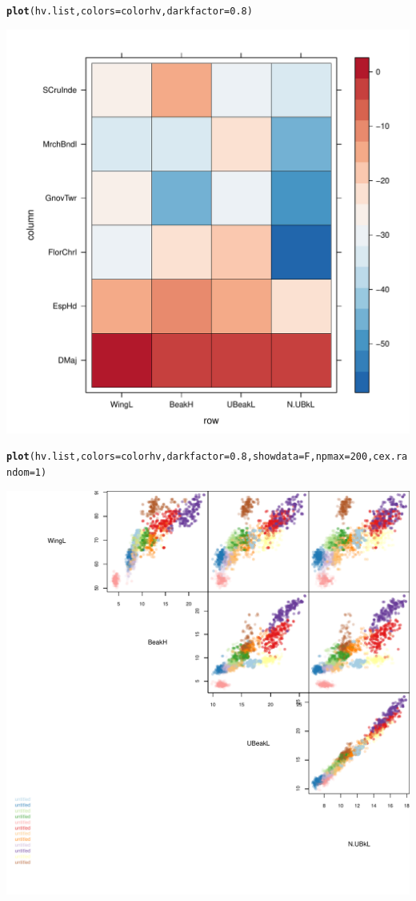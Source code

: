 \documentclass[12pt]{article}\usepackage[]{graphicx}\usepackage[]{color}
\makeatletter
\def\maxwidth{ %
  \ifdim\Gin@nat@width>\linewidth
    \linewidth
  \else
    \Gin@nat@width
  \fi
}
\newcommand{\hlnum}[1]{\textcolor[rgb]{0.686,0.059,0.569}{#1}}%
\newcommand{\hlstd}[1]{\textcolor[rgb]{0.345,0.345,0.345}{#1}}%
\newcommand{\hlkwc}[1]{\textcolor[rgb]{0.333,0.667,0.333}{#1}}%
\newcommand{\hlkwd}[1]{\textcolor[rgb]{0.737,0.353,0.396}{\textbf{#1}}}%
\newenvironment{kframe}{%
 \def\at@end@of@kframe{}%
 \ifinner\ifhmode%
  \def\at@end@of@kframe{\end{minipage}}%
  \begin{minipage}{\columnwidth}%
 \fi\fi%
 \def\FrameCommand##1{\hskip\@totalleftmargin \hskip-\fboxsep
 \colorbox{shadecolor}{##1}\hskip-\fboxsep
     \hskip-\linewidth \hskip-\@totalleftmargin \hskip\columnwidth}%
 \MakeFramed {\advance\hsize-\width
   \@totalleftmargin\z@ \linewidth\hsize
   \@setminipage}}%
 {\par\unskip\endMakeFramed%
 \at@end@of@kframe}
\newenvironment{knitrout}{}{} %
\makeatother
\begin{document}
\begin{knitrout}
\begin{kframe}
\begin{alltt}
\hlkwd{plot}\hlstd{(hv.list,} \hlkwc{colors} \hlstd{= colorhv,} \hlkwc{darkfactor} \hlstd{=} \hlnum{0.8}\hlstd{)}
\end{alltt}
\end{kframe}
\includegraphics[width=\maxwidth]{figure/unnamed-chunk-551} 
\begin{kframe}\begin{alltt}
\hlkwd{plot}\hlstd{(hv.list,} \hlkwc{colors} \hlstd{= colorhv,} \hlkwc{darkfactor} \hlstd{=} \hlnum{0.8}\hlstd{,} \hlkwc{showdata} \hlstd{= F,} \hlkwc{npmax} \hlstd{=} \hlnum{200}\hlstd{,} \hlkwc{cex.random} \hlstd{=} \hlnum{1}\hlstd{)}
\end{alltt}
\end{kframe}
\includegraphics[width=\maxwidth]{figure/unnamed-chunk-552} 


\end{knitrout}
\end{document}
